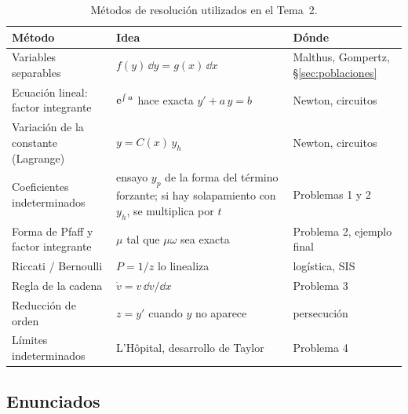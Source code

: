 \documentclass[11pt,twoside]{article}
\begin{document}
\begin{table}[!htbp]
\centering
\small
\renewcommand\arraystretch{1.3}
\begin{tabular}{@{}p{3.7cm} p{5.4cm} p{3.6cm}@{}}
\toprule
\textcolor{acc}{Método} & \textcolor{acc}{Idea} & \textcolor{acc}{Dónde}\\
\midrule
Variables separables & $f(y)\,\dd y=g(x)\,\dd x$ & Malthus, Gompertz, §\ref{sec:poblaciones}\\
Ecuación lineal: factor integrante & $\mathrm{e}^{\int a}$ hace exacta $y'+a\,y=b$ & Newton, circuitos\\
Variación de la constante (Lagrange) & $y=C(x)\,y_h$ & Newton, circuitos\\
Coeficientes indeterminados & ensayo $y_p$ de la forma del término forzante; si hay solapamiento con $y_h$, se multiplica por $t$ & Problemas 1 y 2\\
Forma de Pfaff y factor integrante & $\mu$ tal que $\mu\omega$ sea exacta & Problema 2, ejemplo final\\
Riccati / Bernoulli & $P=1/z$ lo linealiza & logística, SIS\\
Regla de la cadena & $\dot v=v\,\dd v/\dd x$ & Problema 3\\
Reducción de orden & $z=y'$ cuando $y$ no aparece & persecución\\
Límites indeterminados & L'Hôpital, desarrollo de Taylor & Problema 4\\
\bottomrule
\end{tabular}
\caption{Métodos de resolución utilizados en el Tema~2.}
\label{tab:metodos}
\end{table}

\subsection{Enunciados}
\end{document}
